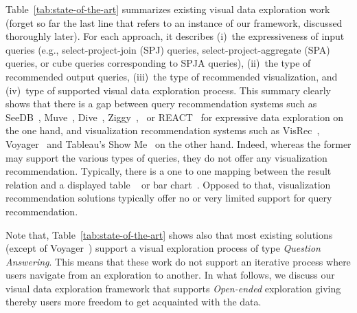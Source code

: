 Table~\ref{tab:state-of-the-art} summarizes existing visual data exploration work (forget so far the last line that refers to an instance of our framework, discussed thoroughly later). 
For each approach, it describes (i)~the expressiveness of input queries (e.g., select-project-join (SPJ) queries, select-project-aggregate (SPA) queries, or cube queries corresponding to SPJA queries), (ii)~the type of recommended output queries, (iii)~the type of recommended visualization, and (iv)~type of supported visual data exploration process. This summary clearly shows that there is a gap between query recommendation systems such as %
 SeeDB~\cite{Vartak}, Muve~\cite{Ehsan:18}, Dive~\cite{MafrurSK18}, Ziggy~\cite{Sellam:16},~\cite{Tang:2017} or REACT~\cite{Milo:2016} for expressive data exploration on the one hand, and visualization recommendation systems such as VisRec~\cite{Mutlu:2016}, Voyager~\cite{Wongsuphasawat2016,Wongsuphasawat:2017} and Tableau's Show Me~\cite{Mackinlay:2007} on the other hand. 
Indeed, whereas the former may support the various types of queries, they do not offer any visualization recommendation.
Typically, there is a one to one mapping between the result relation and a displayed table
~\cite{Milo:2016} or bar chart~\cite{Vartak}. Opposed to that, visualization recommendation solutions typically offer no or very limited support for query recommendation. 

\sloppy
Note that, Table~\ref{tab:state-of-the-art} shows also that most existing solutions (except of Voyager~\cite{Wongsuphasawat2016,Wongsuphasawat:2017}) support a visual exploration process of  type \emph{Question Answering}. This means that these work do not support an iterative process where users navigate from an exploration to another. In what follows, we discuss our visual data exploration framework that supports \emph{Open-ended} exploration giving thereby users more freedom to get acquainted with the data. 





